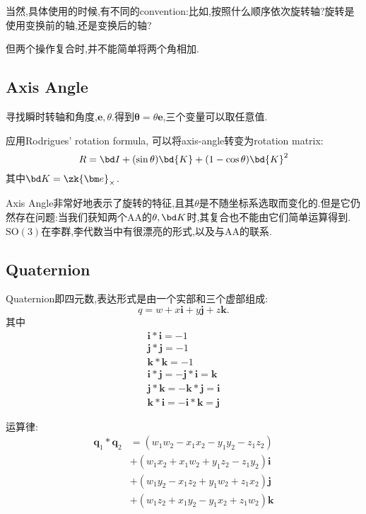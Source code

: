 当然,具体使用的时候,有不同的convention:比如,按照什么顺序依次旋转轴?旋转是使用变换前的轴,还是变换后的轴?

但两个操作复合时,并不能简单将两个角相加.

\subsection{Axis Angle}
寻找瞬时转轴和角度,$\bm e, \theta$.得到$\bm \theta = \theta \bm e$,三个变量可以取任意值.

应用Rodrigues’ rotation formula, 可以将axis-angle转变为rotation matrix:
\begin{equation}
    R=\bd I+(\sin \theta) \bd{K}+(1-\cos \theta) \bd{K}^{2}
\end{equation}
其中$\bd K = \zk{\bm e}_{\times}$.

Axis Angle非常好地表示了旋转的特征,且其$\theta$是不随坐标系选取而变化的.但是它仍然存在问题:当我们获知两个AA的$\theta, \bd K$时,其复合也不能由它们简单运算得到.$\mathrm{SO(3)}$在李群,李代数当中有很漂亮的形式,以及与AA的联系.

\subsection{Quaternion}
Quaternion即四元数,表达形式是由一个实部和三个虚部组成:
\begin{equation}
    q = w + x \bm i + y \bm j + z \bm k.
\end{equation}
其中
\begin{equation}
    \begin{array}{c}
        \mathbf{i} * \mathbf{i}=-1 \\
        \mathbf{j} * \mathbf{j}=-1 \\
        \mathbf{k} * \mathbf{k}=-1 \\
        \mathbf{i} * \mathbf{j}=-\mathbf{j} * \mathbf{i}=\mathbf{k} \\
        \mathbf{j} * \mathbf{k}=-\mathbf{k} * \mathbf{j}=\mathbf{i} \\
        \mathbf{k} * \mathbf{i}=-\mathbf{i} * \mathbf{k}=\mathbf{j}
    \end{array}
\end{equation}

运算律:
\begin{equation}
    \begin{aligned}
        \mathbf{q}_{1} * \mathbf{q}_{2} &=\left(w_{1} w_{2}-x_{1} x_{2}-y_{1} y_{2}-z_{1} z_{2}\right) \\
        &+\left(w_{1} x_{2}+x_{1} w_{2}+y_{1} z_{2}-z_{1} y_{2}\right) \mathbf{i} \\
        &+\left(w_{1} y_{2}-x_{1} z_{2}+y_{1} w_{2}+z_{1} x_{2}\right) \mathbf{j} \\
        &+\left(w_{1} z_{2}+x_{1} y_{2}-y_{1} x_{2}+z_{1} w_{2}\right) \mathbf{k}
    \end{aligned}
\end{equation}

